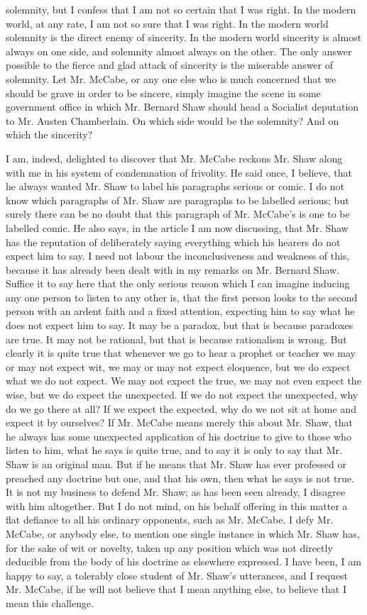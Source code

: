 solemnity, but I confess that I am not so certain that I was right. In the modern world, at any rate, I am not so sure that I was right. In the modern world solemnity is the direct enemy of sincerity. In the modern world sincerity is almost always on one side, and solemnity almost always on the other. The only answer possible to the fierce and glad attack of sincerity is the miserable answer of solemnity. Let Mr. McCabe, or any one else who is much concerned that we should be grave in order to be sincere, simply imagine the scene in some government office in which Mr. Bernard Shaw should head a Socialist deputation to Mr. Austen Chamberlain. On which side would be the solemnity? And on which the sincerity?

I am, indeed, delighted to discover that Mr. McCabe reckons Mr. Shaw along with me in his system of condemnation of frivolity. He said once, I believe, that he always wanted Mr. Shaw to label his paragraphs serious or comic. I do not know which paragraphs of Mr. Shaw are paragraphs to be labelled serious; but surely there can be no doubt that this paragraph of Mr. McCabe’s is one to be labelled comic. He also says, in the article I am now discussing, that Mr. Shaw has the reputation of deliberately saying everything which his hearers do not expect him to say. I need not labour the inconclusiveness and weakness of this, because it has already been dealt with in my remarks on Mr. Bernard Shaw. Suffice it to say here that the only serious reason which I can imagine inducing any one person to listen to any other is, that the first person looks to the second person with an ardent faith and a fixed attention, expecting him to say what he does not expect him to say. It may be a paradox, but that is because paradoxes are true. It may not be rational, but that is because rationalism is wrong. But clearly it is quite true that whenever we go to hear a prophet or teacher we may or may not expect wit, we may or may not expect eloquence, but we do expect what we do not expect. We may not expect the true, we may not even expect the wise, but we do expect the unexpected. If we do not expect the unexpected, why do we go there at all? If we expect the expected, why do we not sit at home and expect it by ourselves? If Mr. McCabe means merely this about Mr. Shaw, that he always has some unexpected application of his doctrine to give to those who listen to him, what he says is quite true, and to say it is only to say that Mr. Shaw is an original man. But if he means that Mr. Shaw has ever professed or preached any doctrine but one, and that his own, then what he says is not true. It is not my business to defend Mr. Shaw; as has been seen already, I disagree with him altogether. But I do not mind, on his behalf offering in this matter a flat defiance to all his ordinary opponents, such as Mr. McCabe. I defy Mr. McCabe, or anybody else, to mention one single instance in which Mr. Shaw has, for the sake of wit or novelty, taken up any position which was not directly deducible from the body of his doctrine as elsewhere expressed. I have been, I am happy to say, a tolerably close student of Mr. Shaw’s utterances, and I request Mr. McCabe, if he will not believe that I mean anything else, to believe that I mean this challenge.

